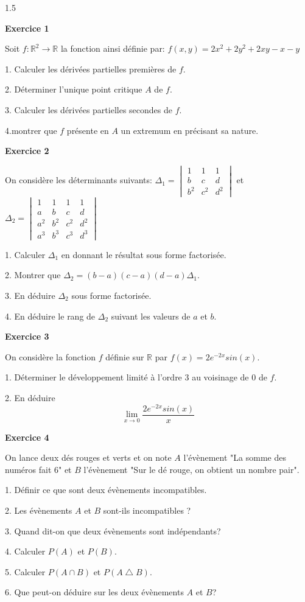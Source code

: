 \documentclass[12pt]{article}
\begin{document}
\begin{spacing}{1.5}

 
 \textbf{Exercice 1 }
 
  Soit $f :\mathbb{R}^2\longrightarrow \mathbb{R}$ la fonction ainsi définie par:
 $f(x,y)=2x^2+2y^2+2xy-x-y$
 
 1. Calculer les dérivées partielles premières de $f$.
 
 2. Déterminer l'unique point critique $A$ de $f$.
 
 3. Calculer les dérivées partielles secondes de $f$.
 
 4.montrer que $f$ présente en $A$ un extremum en précisant sa nature.
 
 \textbf{Exercice 2}
 
  On considère les déterminants suivants:
 $\Delta_1= \begin{vmatrix}
 1 & 1 & 1\\
 b & c & d\\
 b^2 & c^2 & d^2
 \end{vmatrix}$
 et $\Delta_2=\begin{vmatrix}
 1 & 1 & 1 & 1 \\
 a & b & c & d \\
 a^2 & b^2 & c^2 & d^2 \\
 a^3 & b^3 & c^3 & d^3
\end{vmatrix} $
 
 
 1. Calculer $\Delta_1$ en donnant le résultat sous forme factorisée.
 
 2. Montrer que $\Delta_2 =(b-a)(c-a)(d-a)\Delta_1$.
 
 3. En déduire $\Delta_2$ sous forme factorisée.
 
 4. En déduire le rang de $\Delta_2$ suivant les valeurs de $a$ et $b$.
 
 \medskip\textbf{Exercice 3 }
 
 On considère la fonction $f$ définie sur $\mathbb{R}$ par $f(x) = 2e^{-2x}sin(x)$.
 
 1. Déterminer le développement limité à l'ordre 3 au voisinage de 0 de $f$.
 
 2. En déduire
 \[
 \lim_{x\longrightarrow 0}\frac{2e^{-2x}sin(x)}{x}
 \]

 \textbf{Exercice 4 }
 
 On lance deux dés rouges et verts et on note $A$ l'évènement "La somme des numéros fait 6" et
 $B$ l'évènement "Sur le dé rouge, on obtient un nombre pair".
 
 1. Définir ce que sont deux évènements incompatibles.

 2. Les évènements $A$ et $B$ sont-ils incompatibles ?
 
 3. Quand dit-on que deux évènements sont indépendants?
 
 4. Calculer $P(A)$ et $P(B)$.
 
 5. Calculer $P(A\cap B)$ et $P(A\bigtriangleup B)$.
 
 6. Que peut-on déduire sur les deux évènements $A$ et $B$?
 
 
 \quad
 \quad
 

\end{spacing}
\end{document}
